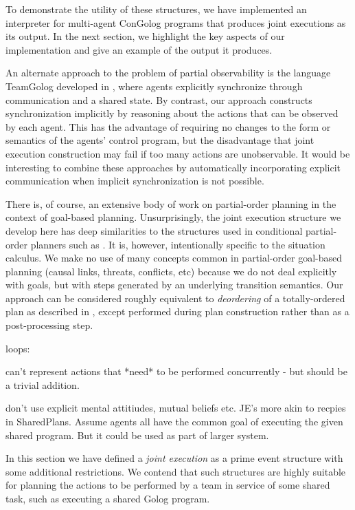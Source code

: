 To demonstrate the utility of these structures, we have implemented
an interpreter for multi-agent ConGolog programs that produces joint
executions as its output. In the next section, we highlight the key
aspects of our implementation and give an example of the output it
produces.

An alternate approach to the problem of partial observability is the
language TeamGolog developed in \citep{farinelli07team_golog}, where
agents explicitly synchronize through communication and a shared state.
By contrast, our approach constructs synchronization implicitly by
reasoning about the actions that can be observed by each agent. This
has the advantage of requiring no changes to the form or semantics
of the agents' control program, but the disadvantage that joint execution
construction may fail if too many actions are unobservable. It would
be interesting to combine these approaches by automatically incorporating
explicit communication when implicit synchronization is not possible.

There is, of course, an extensive body of work on partial-order planning
in the context of goal-based planning. Unsurprisingly, the joint execution
structure we develop here has deep similarities to the structures
used in conditional partial-order planners such as \citep{peot92conditional_nonlinear}.
It is, however, intentionally specific to the situation calculus.
We make no use of many concepts common in partial-order goal-based
planning (causal links, threats, conflicts, etc) because we do not
deal explicitly with goals, but with steps generated by an underlying
transition semantics. Our approach can be considered roughly equivalent
to \emph{deordering} of a totally-ordered plan as described in \citep{backstrom99reordering},
except performed during plan construction rather than as a post-processing
step.

loops: \citep{levesque96what_is_planning,levesque05planning_with_loops}

can't represent actions that {*}need{*} to be performed concurrently
- but should be a trivial addition.

don't use explicit mental attitiudes, mutual beliefs etc. JE's more
akin to recpies in SharedPlans. Assume agents all have the common
goal of executing the given shared program. But it could be used as
part of larger system.

In this section we have defined a \emph{joint execution} as a prime
event structure with some additional restrictions. We contend that
such structures are highly suitable for planning the actions to be
performed by a team in service of some shared task, such as executing
a shared Golog program.

